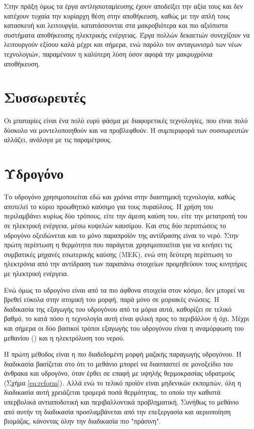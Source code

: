 \documentclass[12pt]{report}
\begin{document}
Στην πράξη όμως τα έργα αντλησιοταμίευσης έχουν αποδείξει την αξία τους και δεν κατέχουν τυχαία την κυρίαρχη θέση στην αποθήκευση, καθώς με την απλή τους κατασκευή και λειτουργία, 
κατατάσσονται στα μακροβιότερα και πιο αξιόπιστα συστήματα αποθήκευσης ηλεκτρικής ενέργειας. Έργα πολλών δεκαετιών συνεχίζουν να λειτουργούν εξίσου καλά μέχρι και σήμερα, ενώ παρόλο τον ανταγωνισμό των νέων τεχνολογιών,
παραμένουν η καλύτερη λύση όσον αφορά την μακρυχρόνια αποθήκευση.
\section{Συσσωρευτές}
Οι μπαταρίες είναι ένα πολύ ευρύ φάσμα με διαφορετικές τεχνολογίες, που είναι πολύ δύσκολο να μοντελοποιηθούν και να προβλεφθούν. Η συμπεριφορά των συσσωρευτών αλλάζει, ανάλογα με τις παραμέτρους.
\section{Υδρογόνο}
Το υδρογόνο χρησιμοποιείται εδώ και χρόνια στην διαστημική τεχνολογία, καθώς αποτελεί το κύριο προωθητικό καύσιμο για τους πυραύλους. Η χρήση του περιλαμβάνει κυρίως δύο τρόπους, είτε την άμεση καύση του, είτε την μετατροπή
του σε ηλεκτρική ενέργεια, μέσω κυψελών καυσίμου. Και στις δύο περιπτώσεις το υδρογόνο οξειδώνεται και το μόνο παραπροϊόν της αντίδρασης είναι το νερό. Στην πρώτη περίπτωση η θερμότητα που παράγεται χρησιμοποιείται για να
κινήσει τις συμβατικές μηχανές εσωτερικής καύσης (ΜΕΚ), ενώ στη δεύτερη περίπτωση το ηλεκτρόνια από την αντίδραση των παραπάνω στοιχείων προμηθεύουν τους κινητήρες με ηλεκτρική ενέργεια.

Ενώ όμως το υδρογόνο είναι από τα πιο άφθονα στοιχεία στον κόσμο, δεν μπορεί να βρεθεί εύκολα στην ατομική του μορφή, παρά μόνο σε μοριακές ενώσεις. Η διαδικασία της εξαγωγής του υδρογόνου από τα μόρια αυτά, 
καθορίζει σε τελικό βαθμό, το κατά πόσο η τεχνολογία αυτή είναι φιλική προς το περιβάλλον ή όχι. Μέχρι και σήμερα οι δύο βασικοί τρόποι εξαγωγής του υδρογόνου είναι η αναμόρφωση του μεθανίου ({}) και η
ηλεκτρόλυση του νερού.

Η πρώτη μέθοδος είναι η πιο διαδεδομένη μορφή μαζικής παραγωγής υδρογόνου. Η διαδικασία βασίζεται στο ότι το μεθάνιο μπορεί να διασπαστεί σε μονοξείδιο του άνθρακα και υδρογόνο, όταν έρθει σε επαφή με υψηλής 
θερμοκρασίας υδρατμούς (Σχήμα \ref{eq:reform}). Αλλά ενώ το τελικό προϊόν είναι μηδενικών εκπομπών, όλη η διαδικασία αυτή χρειάζεται τρομερά ποσά θερμότητας, το οποίο την καθιστά υπερβολικά αντιαποδοτική και 
περιβαλλοντικά προβληματική. Συνήθως το μεθάνιο από αυτήν τη διαδικασία προσλαμβάνεται από την επεξεργασία και αεριοποίηση βιομάζας, κάνοντας όλην την διαδικασία πιο "πράσινη".
\end{document}
